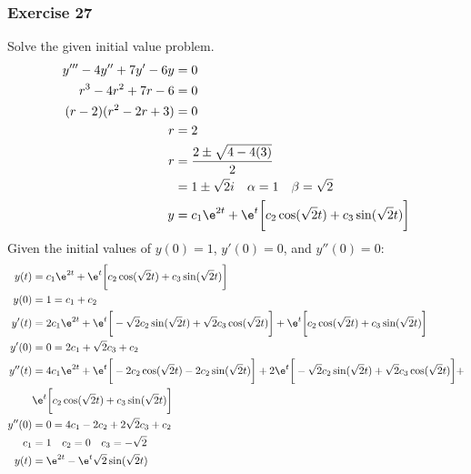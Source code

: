 \documentclass{math}
\begin{document}
\subsubsection*{Exercise 27}
Solve the given initial value problem.
\begin{align*}
  y'''-4y''+7y'-6y &= 0 \\
  r^3-4r^2+7r-6 &= 0 \\
  (r-2)(r^2-2r+3) &= 0 \\
  r &= 2 \\
  r &= \frac{2\pm\sqrt{4-4(3)}}{2} \\
  &= 1\pm\sqrt{2}i \quad \alpha = 1 \quad \beta = \sqrt{2} \\
  y &= c_1\e^{2t}+\e^t\bigg[c_2\cos(\sqrt{2}t)+c_3\sin(\sqrt{2}t)\bigg]
\end{align*}
Given the initial values of \( y(0) = 1 \), \( y'(0) = 0 \), and
\( y''(0) = 0 \):
\begin{align*}
  y(t) &= c_1\e^{2t}+\e^t\bigg[c_2\cos(\sqrt{2}t)+c_3\sin(\sqrt{2}t)\bigg] \\
  y(0) &= 1 = c_1+c_2 \\
  y'(t) &= 2c_1\e^{2t}+
    \e^t\bigg[-\sqrt{2}c_2\sin(\sqrt{2}t)+\sqrt{2}c_3\cos(\sqrt{2}t)\bigg]+
    \e^t\bigg[c_2\cos(\sqrt{2}t)+c_3\sin(\sqrt{2}t)\bigg] \\
  y'(0) &= 0 = 2c_1+\sqrt{2}c_3+c_2 \\
  y''(t) &= 4c_1\e^{2t}+
    \e^t\bigg[-2c_2\cos(\sqrt{2}t)-2c_2\sin(\sqrt{2}t)\bigg]+
    2\e^t\bigg[-\sqrt{2}c_2\sin(\sqrt{2}t)+\sqrt{2}c_3\cos(\sqrt{2}t)\bigg]+ \\
    & \e^t\bigg[c_2\cos(\sqrt{2}t)+c_3\sin(\sqrt{2}t)\bigg] \\
  y''(0) &= 0 = 4c_1-2c_2+2\sqrt{2}c_3+c_2 \\
  c_1 &= 1 \quad c_2 = 0 \quad c_3 = -\sqrt{2} \\
  y(t) &= \e^{2t}-\e^t\sqrt{2}\sin(\sqrt{2}t)
\end{align*}
\end{document}
